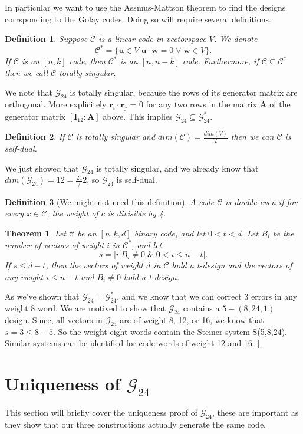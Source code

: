 \documentclass[paper=a4, fontsize=11pt]{scrartcl} %
\numberwithin{equation}{section} %
\numberwithin{figure}{section} %
\numberwithin{table}{section} %
\newtheorem{defn}{Definition}
\newtheorem{thm}{Theorem}
\begin{document}
In particular we want to use the Assmus-Mattson theorem to find the designs corrsponding to the Golay codes. Doing so will require several definitions.
\begin{defn}
Suppose $\mathcal{C}$ is a linear code in vectorspace $V$. We denote 
$$\mathcal{C}^* = \{ \bm{u} \in V | \bm{u} \cdot \bm{w} = 0 \; \forall \; \bm{w} \in V \}. $$
If $\mathcal{C}$ is an $[n,k]$ code, then $\mathcal{C}^*$ is an $[n,n-k]$ code.
Furthermore, if $\mathcal{C}\subseteq\mathcal{C}^*$ then we call $\mathcal{C}$ \textit{totally singular}.
\end{defn}
We note that $\mathcal{G}_{24}$ is totally singular, because the rows of its generator matrix are orthogonal.
More explicitely $\bm{r}_i \cdot \bm{r}_j$ = 0 for any two rows in the matrix $\bm{A}$ of the generator matrix $[\bm{I}_{12}:\bm{A}]$ above. This implies $\mathcal{G}_{24} \subseteq \mathcal{G}_{24}^*$.
\begin{defn}
If $\mathcal{C}$ is totally singular and $dim(\mathcal{C})=\frac{dim(V)}{2}$ then we can $\mathcal{C}$ is \textit{self-dual}.
\end{defn}
We just showed that $\mathcal{G}_{24}$ is totally singular, and we already know that $dim(\mathcal{G}_{24}) = 12 = \frac{24}/2$, so $\mathcal{G}_{24}$ is self-dual.
\begin{defn}[We might not need this definition]
A code $\mathcal{C}$ is \textit{double-even} if for every $x\in \mathcal{C}$, the weight of $c$ is divisible by 4.
\end{defn}
\begin{thm}
Let $\mathcal{C}$ be an $[n,k,d]$ binary code, and let $0<t<d$. Let $B_i$ be the number of vectors of weight $i$ in $\mathcal{C}^*$, and let
$$
s = |{i|B_i \not= 0 \; \& \; 0<i\leq n-t}|.
$$
If $s\leq d-t$, then the vectors of weight $d$ in $\mathcal{C}$ hold a t-design and the vectors of any weight $i\leq n-t$ and $B_i\not=0$ hold a t-design.
\end{thm}

As we've shown that $\mathcal{G}_{24}=\mathcal{G}_{24}^*$, and we know that we can correct 3 errors in any weight 8 word. We are motived to show that $\mathcal{G}_{24}$ contains a $5-(8,24,1)$ design. Since, all vectors in $\mathcal{G}_{24}$ are of weight 8, 12, or 16, we know that $s=3 \leq 8-5$. So the weight eight words contain the Steiner system S(5,8,24). Similar systems can be identified for code words of weight 12 and 16 [\cite{pless}]. 

\section{Uniqueness of $\mathcal{G}_{24}$}
This section will briefly cover the uniqueness proof of $\mathcal{G}_{24}$, these are important as they show that our three constructions actually generate the same code.
\end{document}
